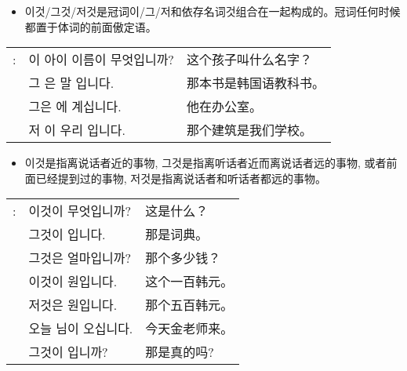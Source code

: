 \begin{grammar}
    \begin{grammarsect}[\kr 이것/그것/저것]
    \begin{itemize}
        \item {\kr 이것/그것/저것}是冠词{\kr 이/그/저}和依存名词{\kr 것}组合在一起构成的。冠词任何时候都置于体词的前面傲定语。
    \end{itemize}
    \begin{tabular}{lll}
        \kr \ruby{例}{예}: &\kr 이 아이 이름이 무엇입니까?&这个孩子叫什么名字？\\
        &\kr 그 \ruby{冊}{책}은 \ruby{韓國}{한국}말 \ruby{敎科書}{교과서}입니다.&那本书是韩国语教科书。\\
        &\kr 그\ruby{分}{분}은 \ruby{事務室}{사무실}에 계십니다.&他在办公室。\\
        &\kr 저 \ruby{建物}{건물}이 우리 \ruby{學校}{학교}입니다.&那个建筑是我们学校。\\
    \end{tabular}
    \begin{itemize}
        \item {\kr 이것}是指离说话者近的事物, {\kr 그것}是指离听话者近而离说话者远的事物, 或者前面已经提到过的事物, 저것是指离说话者和听话者都远的事物。
    \end{itemize}
    \begin{tabular}{lll}
        \kr \ruby{例}{예}: &\kr 이것이 무엇입니까?&这是什么？\\
        &\kr 그것이 \ruby{辭典}{사전}입니다.&那是词典。\\
        &\kr 그것은 얼마입니까?&那个多少钱？\\
        &\kr 이것이 \ruby{百}{백} 원입니다.&这个一百韩元。\\
        &\kr 저것은 \ruby{五百}{오백} 원입니다.&那个五百韩元。\\
        &\kr 오늘 \ruby{金}{김} \ruby{先生}{선생}님이 오십니다.&今天金老师来。\\
        &\kr 그것이 \ruby{事實}{사실}입니까?&那是真的吗?
    \end{tabular}\\
    \end{grammarsect}
\end{grammar}
